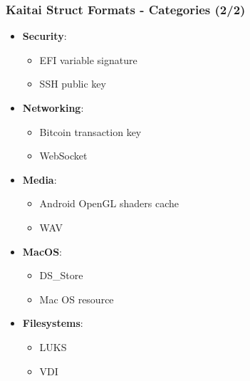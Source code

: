 \begin{frame}
\frametitle{Kaitai Struct Formats - Categories (2/2)}

\begin{itemize}
    \item \textbf{Security}:
          \begin{itemize}
              \item EFI variable signature
              \item SSH public key
          \end{itemize}
    \item \textbf{Networking}:
          \begin{itemize}
              \item Bitcoin transaction key
              \item WebSocket
          \end{itemize}
    \item \textbf{Media}:
          \begin{itemize}
              \item Android OpenGL shaders cache
              \item WAV
          \end{itemize}
    \item \textbf{MacOS}:
          \begin{itemize}
              \item DS\_Store
              \item Mac OS resource
          \end{itemize}
    \item \textbf{Filesystems}:
          \begin{itemize}
              \item LUKS
              \item VDI
          \end{itemize}
\end{itemize}

\end{frame}

